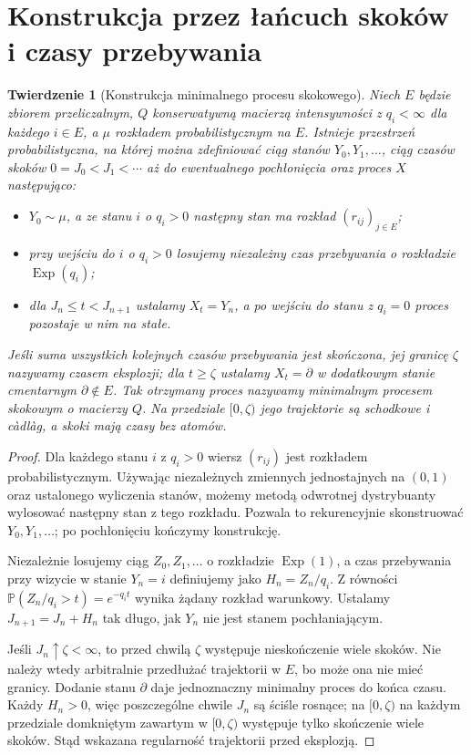 \documentclass[11pt,a4paper,oneside]{report}
\numberwithin{equation}{chapter}
\theoremstyle{plain}
\newtheorem{twierdzenie}{Twierdzenie}[chapter]
\theoremstyle{definition}
\theoremstyle{remark}
\newcommand{\Prob}{\mathbb{P}}
\begin{document}
\section{Konstrukcja przez łańcuch skoków i czasy przebywania}
\begin{twierdzenie}[Konstrukcja minimalnego procesu skokowego]
\label{thm:jump-construction}
Niech $E$ będzie zbiorem przeliczalnym, $Q$ konserwatywną
macierzą intensywności z $q_i<\infty$ dla każdego $i\in E$,
a $\mu$ rozkładem probabilistycznym na $E$.
Istnieje przestrzeń probabilistyczna, na której można
zdefiniować ciąg stanów $Y_0,Y_1,\ldots$, ciąg czasów skoków
$0=J_0<J_1<\cdots$ aż do ewentualnego pochłonięcia oraz
proces $X$ następująco:
\begin{itemize}
\item $Y_0\sim\mu$, a ze stanu $i$ o $q_i>0$ następny stan
ma rozkład $(r_{ij})_{j\in E}$;
\item przy wejściu do $i$ o $q_i>0$ losujemy niezależny
czas przebywania o rozkładzie $\operatorname{Exp}(q_i)$;
\item dla $J_n\le t<J_{n+1}$ ustalamy $X_t=Y_n$,
a po wejściu do stanu z $q_i=0$ proces pozostaje w nim na stałe.
\end{itemize}
Jeśli suma wszystkich kolejnych czasów przebywania jest skończona,
jej granicę $\zeta$ nazywamy \emph{czasem eksplozji}; dla $t\ge\zeta$
ustalamy $X_t=\partial$ w dodatkowym stanie cmentarnym
$\partial\notin E$. Tak otrzymany proces nazywamy
\emph{minimalnym procesem skokowym o macierzy $Q$}.
Na przedziale $[0,\zeta)$ jego trajektorie są schodkowe i
c\`adl\`ag, a skoki mają czasy bez atomów.
\end{twierdzenie}
\begin{proof}
Dla każdego stanu $i$ z $q_i>0$ wiersz $(r_{ij})$ jest
rozkładem probabilistycznym. Używając niezależnych zmiennych
jednostajnych na $(0,1)$ oraz ustalonego wyliczenia stanów,
możemy metodą odwrotnej dystrybuanty wylosować następny stan
z tego rozkładu. Pozwala to rekurencyjnie skonstruować
$Y_0,Y_1,\ldots$; po pochłonięciu kończymy konstrukcję.

Niezależnie losujemy ciąg $Z_0,Z_1,\ldots$ o rozkładzie
$\operatorname{Exp}(1)$, a czas przebywania przy wizycie
w stanie $Y_n=i$ definiujemy jako $H_n=Z_n/q_i$.
Z równości
$\Prob(Z_n/q_i>t)=e^{-q_i t}$ wynika żądany rozkład
warunkowy. Ustalamy $J_{n+1}=J_n+H_n$ tak długo, jak
$Y_n$ nie jest stanem pochłaniającym.

Jeśli $J_n\uparrow\zeta<\infty$, to przed chwilą $\zeta$
występuje nieskończenie wiele skoków. Nie należy wtedy
arbitralnie przedłużać trajektorii w $E$, bo może ona nie
mieć granicy. Dodanie stanu $\partial$ daje jednoznaczny
minimalny proces do końca czasu. Każdy $H_n>0$, więc
poszczególne chwile $J_n$ są ściśle rosnące; na $[0,\zeta)$
na każdym przedziale domkniętym zawartym w $[0,\zeta)$
występuje tylko skończenie wiele skoków. Stąd wskazana
regularność trajektorii przed eksplozją.
\end{proof}
\end{document}
